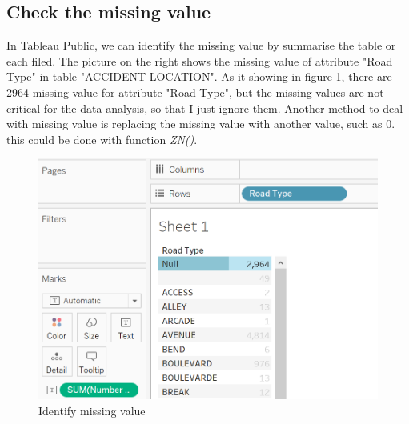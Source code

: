 \documentclass[10pt]{article}
\theoremstyle{definition}
\begin{document}
\subsection{Check the missing value}
\vspace{-12pt}
\begin{minipage}{\linewidth}
  	\centering
  	\begin{minipage}{0.53\linewidth}
		In Tableau Public, we can identify the missing value by summarise the table or each filed. The picture on the right shows the missing value of attribute "Road Type" in table "ACCIDENT$\_$LOCATION". As it showing in figure \ref{fig:identifyMissingValue}, there are 2964 missing value for attribute "Road Type", but the missing values are not critical for the data analysis, so that I just ignore them. Another method to deal with missing value is replacing the missing value with another value, such as 0. this could be done with function \textit{ZN()}.  \par
  \end{minipage}
  \hspace{0.03\linewidth}
  \begin{minipage}{0.4\linewidth}
        \begin{figure}[H]
     	\includegraphics[width=\linewidth]{images/IdentifyMissingValue.png}
        \caption{Identify missing value}
        \label{fig:identifyMissingValue}
        \end{figure}
    \end{minipage}\\
    \vspace{12pt}
\end{minipage}\\ 
\end{document}
